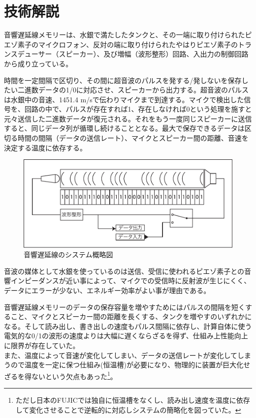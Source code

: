 \documentclass[a4paper,report]{jsbook}
\begin{document}
\section{技術解説}\label{ux6280ux8853ux89e3ux8aac}

音響遅延線メモリーは、水銀で満たしたタンクと、その一端に取り付けられたピエゾ素子のマイクロフォン、反対の端に取り付けられたやはりピエゾ素子のトランスデューサー（スピーカー）、及び増幅（波形整形）回路、入出力の制御回路から成り立っている。

時間を一定間隔で区切り、その間に超音波のパルスを発する/発しないを保存したい二進数データの1/0に対応させ、スピーカーから出力する。超音波のパルスは水銀中の音速、1451.4
m/sで伝わりマイクまで到達する。マイクで検出した信号を、回路の中で、パルスが存在すれば1、存在しなければ0という処理を施すと元々送信した二進数データが復元される。それをもう一度同じスピーカーに送信すると、同じデータ列が循環し続けることとなる。最大で保存できるデータは区切る時間の間隔（データの送信レート）、マイクとスピーカー間の距離、音速を決定する温度に依存する。

\begin{no-prefix-figure-caption}

\begin{figure}[htbp]
\centering
\includegraphics[width=1.00000\textwidth]{./img/adm_setsumei.pdf}
\caption{音響遅延線のシステム概略図}
\end{figure}

\end{no-prefix-figure-caption}

音波の媒体として水銀を使っているのは送信、受信に使われるピエゾ素子との音響インピーダンスが近い事によって、マイクでの受信時に反射波が生じにくく、データにエラーが少ない、エネルギー効率がよい事が理由である。

音響遅延線メモリーのデータの保存容量を増やすためにはパルスの間隔を短くすること、マイクとスピーカー間の距離を長くする、タンクを増やすのいずれかになる。そして読み出し、書き出しの速度もパルス間隔に依存し、計算自体に使う電気的な0/1の波形の速度よりは大幅に遅くならざるを得ず、仕組み上性能向上に限界が存在していた。\\
また、温度によって音速が変化してしまい、データの送信レートが変化してしまうので温度を一定に保つ仕組み(恒温槽)が必要になり、物理的に装置が巨大化せざるを得ないという欠点もあった\footnote{ただし日本のFUJICでは独自に恒温槽をなくし、読み出し速度を温度に依存して変化させることで逆転的に対応しシステムの簡略化を図っていた。}。
\end{document}
